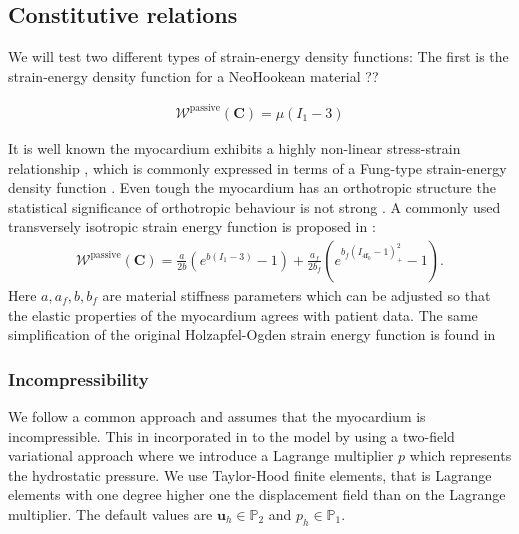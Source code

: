 \documentclass[a4paper,10pt]{article}
\newcommand{\uvec}{\mathbf{u}}
\newcommand{\ef}{\mathbf{f}_0}
\newcommand{\C}{\mathbf{C}}
\begin{document}
\subsection{Constitutive relations}



We will test two different types of strain-energy density functions:
The first is the strain-energy density function for a NeoHookean material ??%

\begin{align}
 \mathcal{W}^{\text{passive}}(\C)  = \mu (I_1 - 3)
\label{eq:neohokean}
\end{align}

It is well known the myocardium exhibits a highly non-linear
stress-strain relationship \cite{dokos2002shear}, which is commonly expressed
in terms of a Fung-type strain-energy density function \cite{holzapfel2009constitutive, 
humphrey1987constitutive, costa2001modelling}. Even tough the myocardium has an 
orthotropic structure the statistical significance of orthotropic behaviour is 
not strong \cite{dokos2002shear}. A commonly used transversely 
isotropic strain energy function is proposed in  \cite{holzapfel2009constitutive}:
\begin{align}
\label{eq:hoa}
 \mathcal{W}^{\text{passive}}(\C)  = \frac{a}{2 b} \left( e^{ b (I_1 
 - 3)}  -1 \right)
 + \frac{a_f}{2 b_f} \left( e^{ b_f (I_{4\ef} 
 - 1)_+^2} -1 \right).
\end{align}
Here  $a, a_f, b, b_f$ are material stiffness parameters which can be adjusted so that the elastic
properties of the myocardium agrees with patient data.
The same simplification of the original Holzapfel-Ogden strain energy
function is found in \cite{balaban2016patient, Krishnamurthy2013, gjerald2014patient, asner2015estimation}

\subsubsection{Incompressibility}


We follow a common approach and assumes that the myocardium is incompressible. 
This in incorporated in to the model by using a two-field variational 
approach where we introduce a Lagrange multiplier $p$ which represents the 
hydrostatic pressure. We use Taylor-Hood finite elements, that is
Lagrange elements with one degree higher one the displacement field than on the Lagrange multiplier.
The default values are $\uvec_h \in \mathbb{P}_2$ and $p_h \in \mathbb{P}_1$.
\end{document}
